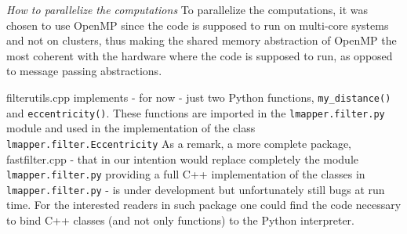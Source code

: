 \textit{How to parallelize the computations} To parallelize the computations, it was chosen to use OpenMP since the code is supposed to run on multi-core systems and not on clusters, thus making the shared memory abstraction of OpenMP the most coherent with the hardware where the code is supposed to run, as opposed to message passing abstractions.

filterutils.cpp implements - for now - just two Python functions, \lstinline|my_distance()| and \lstinline|eccentricity()|. These functions are imported in the \lstinline|lmapper.filter.py| module and used in the implementation of the class \lstinline|lmapper.filter.Eccentricity|
As a remark, a more complete package, fastfilter.cpp - that in our intention would replace completely the module \lstinline|lmapper.filter.py| providing a full C++ implementation of the classes in \lstinline|lmapper.filter.py| - is under development but unfortunately still bugs at run time. For the interested readers in such package one could find the code necessary to bind C++ classes (and not only functions) to the Python interpreter.